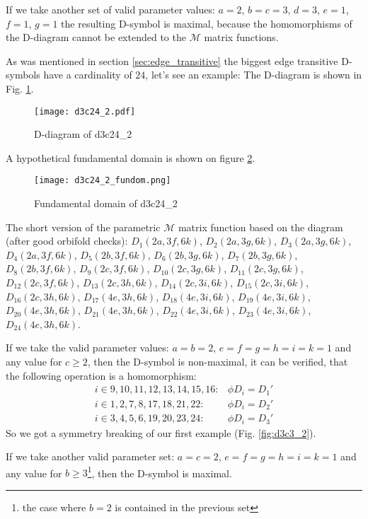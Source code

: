 \documentclass[12pt,a4paper]{article}
\numberwithin{equation}{section}
\theoremstyle{plain}%
\theoremstyle{definition}
\theoremstyle{remark}
\begin{document}
If we take another set of valid parameter values: $a=2$, $b=c=3$, $d=3$, $e=1$,
$f=1$, $g=1$ the resulting D-symbol is maximal, because the homomorphisms of the
D-diagram cannot be extended to the $\mathcal{M}$ matrix functions.

As was mentioned in section \ref{sec:edge_transitive} the biggest edge
transitive D-symbols have a cardinality of $24$, let's see an example:
The D-diagram is shown in Fig.
\ref{fig:d3c24_2}.

\begin{figure}
  \caption{\label{fig:d3c24_2} D-diagram of d3c24\_2}
  \center
  \texttt{[image: d3c24\_2.pdf]}
\end{figure}

A hypothetical fundamental domain is shown on figure \ref{fig:d3c24_2_fundom}.

\begin{figure}
  \caption{\label{fig:d3c24_2_fundom} Fundamental domain of d3c24\_2}
  \center
  \texttt{[image: d3c24\_2\_fundom.png]}
\end{figure}

The short version of the parametric $\mathcal{M}$ matrix function based on the
diagram (after good orbifold checks): $D_1(2a, 3f, 6k)$, $D_2(2a, 3g, 6k)$,
$D_3(2a, 3g, 6k)$, $D_4(2a, 3f, 6k)$, $D_5(2b, 3f, 6k)$, $D_6(2b, 3g, 6k)$,
$D_7(2b, 3g, 6k)$, $D_8(2b, 3f, 6k)$, $D_9(2c, 3f, 6k)$, $D_{10}(2c, 3g, 6k)$,
$D_{11}(2c, 3g, 6k)$, $D_{12}(2c, 3f, 6k)$, $D_{13}(2c, 3h, 6k)$, $D_{14}(2c,
3i, 6k)$, $D_{15}(2c, 3i, 6k)$, $D_{16}(2c, 3h, 6k)$, $D_{17}(4e, 3h, 6k)$,
$D_{18}(4e, 3i, 6k)$, $D_{19}(4e, 3i, 6k)$, $D_{20}(4e, 3h, 6k)$, $D_{21}(4e,
3h, 6k)$, $D_{22}(4e, 3i, 6k)$, $D_{23}(4e, 3i, 6k)$, $D_{24}(4e, 3h, 6k)$.

If we take the valid parameter values: $a=b=2$, $e=f=g=h=i=k=1$ and any value
for $c\geq2$, then the D-symbol is non-maximal, it can be verified, that the
following operation is a homomorphism:
\begin{align}
  i\in{9,10,11,12,13,14,15,16}: & \phi{D_i}=D_1' \\
  i\in{1,2,7,8,17,18,21,22}: & \phi{D_i}=D_2' \\
  i\in{3,4,5,6,19,20,23,24}: & \phi{D_i}=D_3'
\end{align}
So we got a symmetry breaking of our first example (Fig. \ref{fig:d3c3_2}).

If we take another valid parameter set: $a=c=2$, $e=f=g=h=i=k=1$ and any value
for $b\geq3$\footnote{the case where $b=2$ is contained in the previous set},
then the D-symbol is maximal.
\end{document}
